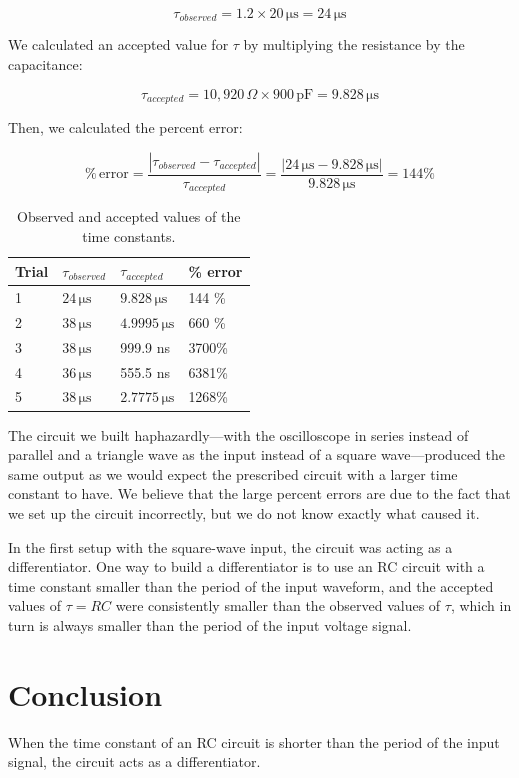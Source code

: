 \documentclass[11pt, titlepage, letterpaper, twoside]{article}
\begin{document}
$$
\tau_{observed} = 1.2 \times 20\,\mathrm{\mu s} = 24\,\mathrm{\mu s}
$$

We calculated an accepted value for $\tau$ by multiplying the resistance by the capacitance:

$$
\tau_{accepted} = 10,920\,\Omega \times 900\,\mathrm{pF} = 9.828\,\mathrm{\mu s}
$$

Then, we calculated the percent error:

$$
\mathrm{\%\,error} = \frac{\left| \tau_{observed} - \tau_{accepted} \right|}{\tau_{accepted}}
                   = \frac{\left| 24\,\mathrm{\mu s} - 9.828\,\mathrm{\mu s} \right|}{9.828\,\mathrm{\mu s}}
                   = 144 \%
$$

\begin{table}[h!]
\centering
\caption{Observed and accepted values of the time constants.}
\label{calculations}
\begin{tabular}{|l|l|l|l|}
\hline
Trial & $\tau_{observed}$    & $\tau_{accepted}$        & \% error \\ \hline
1     & $24\,\mathrm{\mu s}$ & $9.828\,\mathrm{\mu s}$  & 144 \%   \\ \hline
2     & $38\,\mathrm{\mu s}$ & $4.9995\,\mathrm{\mu s}$ & 660 \%   \\ \hline
3     & $38\,\mathrm{\mu s}$ & 999.9 ns                 & 3700\%   \\ \hline
4     & $36\,\mathrm{\mu s}$ & 555.5 ns                 & 6381\%   \\ \hline
5     & $38\,\mathrm{\mu s}$ & $2.7775\,\mathrm{\mu s}$ & 1268\%   \\ \hline
\end{tabular}
\end{table}

The circuit we built haphazardly---with the oscilloscope in series instead of parallel and
a triangle wave as the input instead of a square wave---produced the same output as we would
expect the prescribed circuit with a larger time constant to have. We believe that the large
percent errors are due to the fact that we set up the circuit incorrectly, but we do not
know exactly what caused it.

In the first setup with the square-wave input, the circuit was acting as a differentiator.
One way to build a differentiator is to use an RC circuit with a time constant smaller than
the period of the input waveform, and the accepted values of $\tau = RC$ were consistently
smaller than the observed values of $\tau$, which in turn is always smaller than the period of
the input voltage signal.

\section{Conclusion}
When the time constant of an RC circuit is shorter than the period of the input signal,
the circuit acts as a differentiator.
\end{document}
